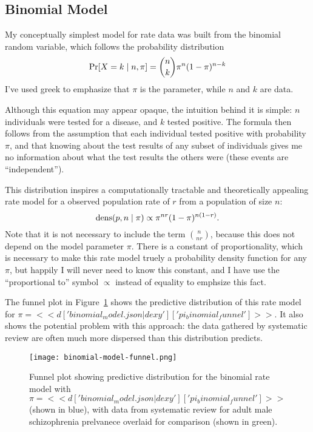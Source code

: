 \subsection{Binomial Model}
My conceptually simplest model for rate data was built from the
binomial random variable, which follows the probability distribution
\[
\operatorname{Pr}[X=k\;|\; n,\pi] = \binom{n}{k}\pi^n(1-\pi)^{n-k}
\]
I've used greek to emphasize that $\pi$ is the parameter, while $n$
and $k$ are data.

Although this equation may appear opaque, the intuition behind it is
simple: $n$ individuals were tested for a disease, and $k$ tested
positive. The formula then follows from the assumption that each
individual tested positive with probability $\pi$, and that 
knowing about the test results of any subset of individuals gives me
no information about what the test results the others were
(these events are ``independent'').

This distribution inspires a computationally tractable and
theoretically appealing rate model for a observed population rate of
$r$ from a population of size $n$:
\[
\operatorname{dens}(p,n\;|\; \pi) \propto \pi^{nr}(1-\pi)^{n(1-r)}.
\]
Note that it is not necessary to include the term $\binom{n}{nr}$,
because this does not depend on the model parameter $\pi$. There is a
constant of proportionality, which is necessary to make this rate
model truely a probability density function for any $\pi$, but happily
I will never need to know this constant, and I have use the ``proportional to''
symbol $\propto$ instead of equality to emphsize this fact.

The funnel plot in Figure~\ref{fig:theory-rate_model-binom_funnel}
shows the predictive distribution of this rate model for $\pi=<<
d['binomial_model.json|dexy']['pi_binomial_funnel'] >>$.  It also shows
the potential problem with this approach: the data gathered by
systematic review are often much more dispersed than this
distribution predicts.

\begin{figure}[ht]
\begin{center}
\texttt{[image: binomial-model-funnel.png]}
\end{center}
\caption{Funnel plot showing predictive distribution for the binomial
  rate model with
  $\pi=<<d['binomial_model.json|dexy']['pi_binomial_funnel']>>$ (shown in
  blue), with data from systematic review for adult male schizophrenia
  prelvanece overlaid for comparison (shown in green).}
\label{fig:theory-rate_model-binom_funnel}
\end{figure}

